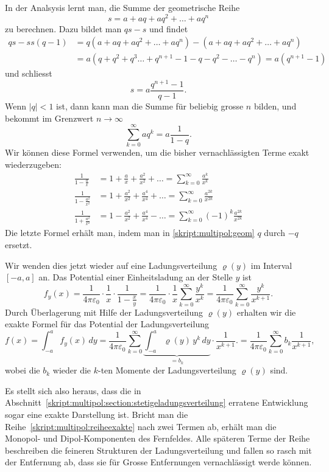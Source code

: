 In der Analsysis lernt man, die Summe der geometrische Reihe 
\[
s=a+aq+aq^2+\dots + aq^n
\]
zu berechnen.
Dazu bildet man $qs - s$ und findet
\begin{align*}
qs-s
s(q-1)
&=
q(a+aq+aq^2+\dots + aq^n)-(a+aq+aq^2+\dots + aq^n)
\\
&=
a(q+q^2+q^3\dots+q^{n+1}-1-q-q^2-\dots-q^n)
=
a(q^{n+1}-1)
\end{align*}
und schliesst
\[
s=a\frac{q^{n+1}-1}{q-1}.
\]
Wenn $|q|<1$ ist, dann kann man die Summe für beliebig grosse $n$ bilden,
und bekommt im Grenzwert $n\to\infty$
\begin{equation}
\sum_{k=0}^\infty aq^k = a\frac{1}{1-q}.
\label{skript:multipol:geom}
\end{equation}
Wir können diese Formel verwenden, um die bisher vernachlässigten Terme
exakt wiederzugeben:
\begin{align*}
\frac{1}{1-\frac{a}{x}}
&=
1+\frac{a}{x}+\frac{a^2}{x^2}+\dots
=
\sum_{k=0}^\infty \frac{a^k}{x^k}
\\
\frac{1}{1-\frac{a^2}{x^2}}
&=
1+\frac{a^2}{x^2}+\frac{a^4}{x^4}+\dots
=
\sum_{k=0}^\infty \frac{a^{2k}}{x^{2k}}
\\
\frac{1}{1+\frac{a^2}{x^2}}
&=
1-\frac{a^2}{x^2}+\frac{a^4}{x^4}-\dots
=
\sum_{k=0}^\infty (-1)^k\frac{a^{2k}}{x^{2k}}
\end{align*}
Die letzte Formel erhält man, indem man in \eqref{skript:multipol:geom}
$q$ durch $-q$ ersetzt.

Wir wenden dies jetzt wieder auf eine Ladungsverteilung
$\varrho(y)$ im Interval $[-a,a]$ an.
Das Potential einer Einheitsladung an der Stelle $y$ ist
\[
f_y(x)
=
\frac1{4\pi\varepsilon_0}\cdot \frac{1}{x}\cdot\frac{1}{1-\frac{x}{y}}
=
\frac1{4\pi\varepsilon_0}\cdot \frac{1}{x}
\sum_{k=0}^\infty \frac{y^k}{x^k}
=
\frac1{4\pi\varepsilon_0}
\sum_{k=0}^\infty \frac{y^k}{x^{k+1}}.
\]
Durch Überlagerung mit Hilfe der Ladungsverteilung $\varrho(y)$ 
erhalten wir die exakte Formel für das Potential der Ladungsverteilung
\begin{equation}
f(x)
=
\int_{-a}^af_y(x)\,dy
=
\frac{1}{4\pi\varepsilon_0}
\sum_{k=0}^\infty
\underbrace{\int_{-a}^a\varrho(y)\,y^k\,dy}_{\displaystyle =b_k}
\cdot\frac{1}{x^{k+1}}.
=
\frac{1}{4\pi\varepsilon_0}
\sum_{k=0}^\infty b_k\frac{1}{x^{k+1}},
\label{skript:multipol:reiheexakte}
\end{equation}
wobei die $b_k$ wieder die $k$-ten Momente der Ladungsverteilung
$\varrho(y)$ sind.

Es stellt sich also heraus, dass die in
Abschnitt~\ref{skript:multipol:section:stetigeladungsverteilung}
erratene Entwicklung sogar eine exakte Darstellung ist.
Bricht man die Reihe~\eqref{skript:multipol:reiheexakte} nach zwei
Termen ab, erhält man die Monopol- und Dipol-Komponenten des
Fernfeldes.
Alle späteren Terme der Reihe beschreiben die feineren Strukturen
der Ladungsverteilung und fallen so rasch mit der Entfernung ab,
dass sie für Grosse Entfernungen vernachlässigt werde können.

